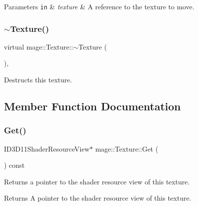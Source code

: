 \begin{DoxyParams}[1]{Parameters}
\mbox{\tt in}  & {\em texture} & A reference to the texture to move. \\
\hline
\end{DoxyParams}
\hypertarget{classmage_1_1_texture_a81664804ac0259e8c67851409ee106fa}{}\label{classmage_1_1_texture_a81664804ac0259e8c67851409ee106fa} 
\subsubsection{\texorpdfstring{$\sim$\+Texture()}{~Texture()}}
{\footnotesize\ttfamily virtual mage\+::\+Texture\+::$\sim$\+Texture (\begin{DoxyParamCaption}{ }\end{DoxyParamCaption})\hspace{0.3cm}{\ttfamily [virtual]}, {\ttfamily [default]}}

Destructs this texture. 

\subsection{Member Function Documentation}
\hypertarget{classmage_1_1_texture_a701475a90e2c1e8493a05afb0262c609}{}\label{classmage_1_1_texture_a701475a90e2c1e8493a05afb0262c609} 
\subsubsection{\texorpdfstring{Get()}{Get()}}
{\footnotesize\ttfamily I\+D3\+D11\+Shader\+Resource\+View$\ast$ mage\+::\+Texture\+::\+Get (\begin{DoxyParamCaption}{ }\end{DoxyParamCaption}) const}

Returns a pointer to the shader resource view of this texture.

\begin{DoxyReturn}{Returns}
A pointer to the shader resource view of this texture. 
\end{DoxyReturn}
\hypertarget{classmage_1_1_texture_aaf28232c9d81ebea04ef4944b5fec465}{}\label{classmage_1_1_texture_aaf28232c9d81ebea04ef4944b5fec465} 
